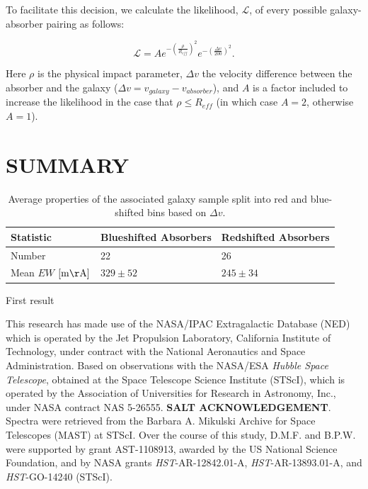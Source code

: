 \documentclass[iop]{emulateapj-rtx4}
\begin{document}
To facilitate this decision, we calculate the likelihood, $\mathcal{L}$, of every possible galaxy-absorber pairing as follows:

\begin{equation}
	\mathcal{L} = A e^{-(\frac{\rho}{R_{eff}})^2} e^{-(\frac{\Delta v}{200})^2}.
\end{equation}

\noindent Here $\rho$ is the physical impact parameter, $\Delta v$ the velocity difference between the absorber and the galaxy ($\Delta v = v_{galaxy} - v_{absorber}$), and $A$ is a factor included to increase the likelihood in the case that $\rho \leq R_{eff}$ (in which case $A = 2$, otherwise $A = 1$). 



\section{SUMMARY}



\begin{table}[ht]\footnotesize
\begin{center}
\begin{tabular}{l l l}
 \hline \hline
 Statistic                				&  Blueshifted Absorbers   &     Redshifted Absorbers     \\ 
  \hline \hline
 Number 	          			 		&     	22				&	26			\\
 Mean $EW$    \scriptsize $\rm [m\AA]$    &	$329 \pm 52$ 		&	$245 \pm 34$  	\\
  
\hline
\end{tabular}
\end{center}
  \caption{\small{Average properties of the associated galaxy sample split into red and blue-shifted bins based on $\Delta v$.}}
  \label{resultsTable}
\end{table}


\vspace{10pt}

\indent \textbullet \indent First result


\acknowledgements

This research has made use of the NASA/IPAC Extragalactic Database (NED) which is operated by the Jet Propulsion Laboratory, California Institute of Technology, under contract with the National Aeronautics and Space Administration. Based on observations with the NASA/ESA \textit{Hubble Space Telescope}, obtained at the Space Telescope Science Institute (STScI), which is operated by the Association of Universities for Research in Astronomy, Inc., under NASA contract NAS 5-26555. \textbf{SALT ACKNOWLEDGEMENT}. Spectra were retrieved from the Barbara A. Mikulski Archive for Space Telescopes (MAST) at STScI. Over the course of this study, D.M.F. and B.P.W. were supported by grant AST-1108913, awarded by the US National Science Foundation, and by NASA grants \textit{HST}-AR-12842.01-A, \textit{HST}-AR-13893.01-A, and \textit{HST}-GO-14240 (STScI). 



\nocite{*}


\end{document}
